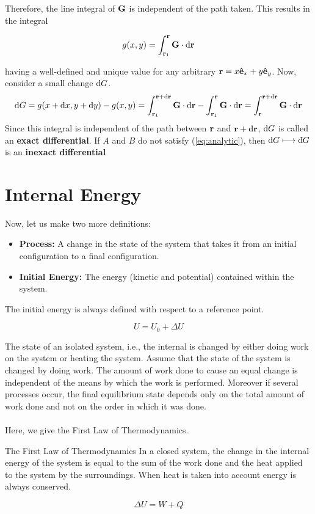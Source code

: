     Therefore, the line integral of $\mathbf{G}$ is independent of the path taken. This results in the integral
    
    \begin{equation}
        g(x,y) = \int_{\mathbf{r}_1}^{\mathbf{r}}\mathbf{G}\cdot\text{d}\mathbf{r}
    \end{equation}
    
    having a well-defined and unique value for any arbitrary $\mathbf{r} = x\mathbf{\hat{e}}_{x}+y\mathbf{\hat{e}}_{y}$. Now, consider a small change $\text{d} G$. 
    \begin{equation}
        \text{d} G = g(x+\text{d} x, y+\text{d} y) - g(x,y)= \int_{\mathbf{r}_1}^{\mathbf{r}+\text{d}\mathbf{r}}\mathbf{G}\cdot\text{d}\mathbf{r}-\int_{\mathbf{r}_1}^{\mathbf{r}}\mathbf{G}\cdot\text{d}\mathbf{r} = \int_{\mathbf{r}}^{\mathbf{r}+\text{d}\mathbf{r}}\mathbf{G}\cdot\text{d}\mathbf{r}
    \end{equation}
    Since this integral is independent of the path between $\mathbf{r}$ and $\mathbf{r}+\text{d}\mathbf{r}$, $\text{d} G$ is called an \textbf{exact differential}. If $A$ and $B$ do not satisfy (\ref{eq:analytic}), then $\text{d} G \longmapsto \text{d}\hspace*{-0.13em}\bar{}\hspace*{0.1em} G$ is an \textbf{inexact differential}
\newpage

\section{Internal Energy}
\label{sec:1.3internalenergy}
    Now, let us make two more definitions:
    \begin{itemize}
        \item \textbf{Process:} A change in the state of the system that takes it from an initial configuration to a final configuration.
        \item \textbf{Initial Energy:} The energy (kinetic and potential) contained within the system.
    \end{itemize}
    
    The initial energy is always defined with respect to a reference point.
    
    \begin{equation}
        U = U_0 + \Delta U
    \end{equation}
    
    The state of an isolated system, i.e., the internal is changed by either doing work on the system or heating the system. 
    Assume that the state of the system is changed by doing work. The amount of work done to cause an equal change is independent of the means by which the work is performed. Moreover if several processes occur, the final equilibrium state depends only on the total amount of work done and not on the order in which it was done. \\
    \\
    \noindent Here, we give the First Law of Thermodynamics.
    \begin{law*}{The First Law of Thermodynamics}
        In a closed system, the change in the internal energy of the system is equal to the sum of the work done and the heat applied to the system by the surroundings. When heat is taken into account energy is always conserved.
        
        \begin{equation}
            \Delta U = W+Q
        \end{equation}
    \end{law*}
